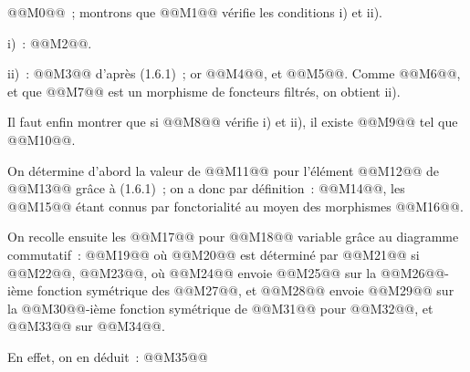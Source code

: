 
@@M0@@~;
montrons que @@M1@@ vérifie les conditions i) et ii).

i)~: @@M2@@.

ii)~: @@M3@@ d'après (1.6.1)~; or @@M4@@, et @@M5@@. Comme @@M6@@, et que @@M7@@ est un morphisme de foncteurs filtrés, on obtient ii).

Il faut enfin montrer que si @@M8@@ vérifie i) et ii), il existe @@M9@@ tel que @@M10@@.

On détermine d'abord la valeur de @@M11@@ pour l'élément @@M12@@ de @@M13@@ grâce à (1.6.1)~; on a donc par définition~: @@M14@@, les @@M15@@ étant connus par fonctorialité au moyen des morphismes @@M16@@.

On recolle ensuite les @@M17@@ pour @@M18@@ variable grâce au diagramme commutatif~:
@@M19@@
où @@M20@@ est déterminé par @@M21@@ si @@M22@@, @@M23@@, où @@M24@@ envoie @@M25@@ sur la @@M26@@-ième fonction symétrique des @@M27@@, et @@M28@@ envoie @@M29@@ sur la @@M30@@-ième fonction symétrique de @@M31@@ pour @@M32@@, et @@M33@@ sur @@M34@@.

En effet, on en déduit~:
@@M35@@
